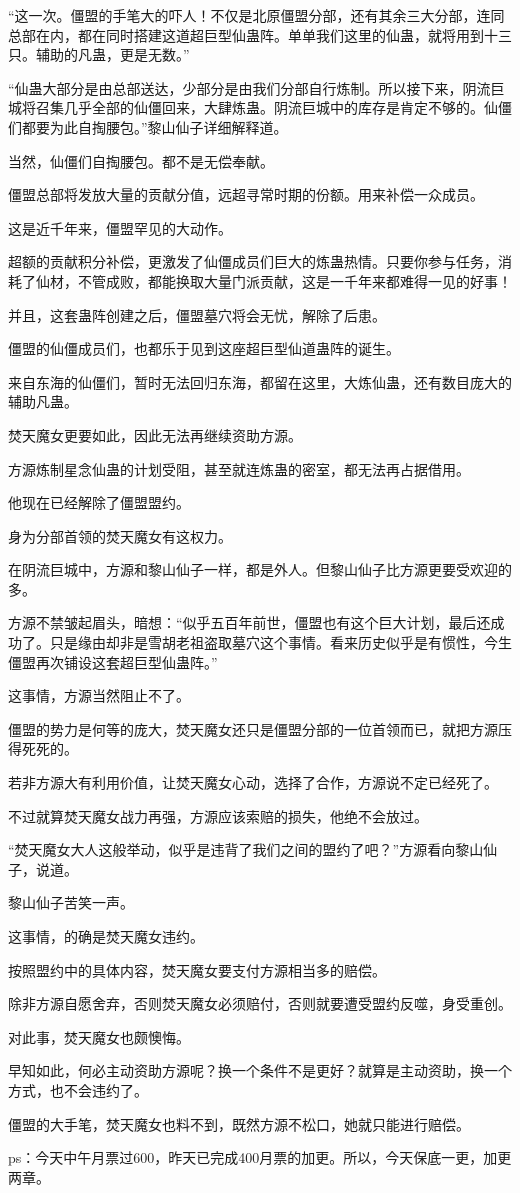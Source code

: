 \begin{this_body}
“这一次。僵盟的手笔大的吓人！不仅是北原僵盟分部，还有其余三大分部，连同总部在内，都在同时搭建这道超巨型仙蛊阵。单单我们这里的仙蛊，就将用到十三只。辅助的凡蛊，更是无数。”

“仙蛊大部分是由总部送达，少部分是由我们分部自行炼制。所以接下来，阴流巨城将召集几乎全部的仙僵回来，大肆炼蛊。阴流巨城中的库存是肯定不够的。仙僵们都要为此自掏腰包。”黎山仙子详细解释道。

当然，仙僵们自掏腰包。都不是无偿奉献。

僵盟总部将发放大量的贡献分值，远超寻常时期的份额。用来补偿一众成员。

这是近千年来，僵盟罕见的大动作。

超额的贡献积分补偿，更激发了仙僵成员们巨大的炼蛊热情。只要你参与任务，消耗了仙材，不管成败，都能换取大量门派贡献，这是一千年来都难得一见的好事！

并且，这套蛊阵创建之后，僵盟墓穴将会无忧，解除了后患。

僵盟的仙僵成员们，也都乐于见到这座超巨型仙道蛊阵的诞生。

来自东海的仙僵们，暂时无法回归东海，都留在这里，大炼仙蛊，还有数目庞大的辅助凡蛊。

焚天魔女更要如此，因此无法再继续资助方源。

方源炼制星念仙蛊的计划受阻，甚至就连炼蛊的密室，都无法再占据借用。

他现在已经解除了僵盟盟约。

身为分部首领的焚天魔女有这权力。

在阴流巨城中，方源和黎山仙子一样，都是外人。但黎山仙子比方源更要受欢迎的多。

方源不禁皱起眉头，暗想：“似乎五百年前世，僵盟也有这个巨大计划，最后还成功了。只是缘由却非是雪胡老祖盗取墓穴这个事情。看来历史似乎是有惯性，今生僵盟再次铺设这套超巨型仙蛊阵。”

这事情，方源当然阻止不了。

僵盟的势力是何等的庞大，焚天魔女还只是僵盟分部的一位首领而已，就把方源压得死死的。

若非方源大有利用价值，让焚天魔女心动，选择了合作，方源说不定已经死了。

不过就算焚天魔女战力再强，方源应该索赔的损失，他绝不会放过。

“焚天魔女大人这般举动，似乎是违背了我们之间的盟约了吧？”方源看向黎山仙子，说道。

黎山仙子苦笑一声。

这事情，的确是焚天魔女违约。

按照盟约中的具体内容，焚天魔女要支付方源相当多的赔偿。

除非方源自愿舍弃，否则焚天魔女必须赔付，否则就要遭受盟约反噬，身受重创。

对此事，焚天魔女也颇懊悔。

早知如此，何必主动资助方源呢？换一个条件不是更好？就算是主动资助，换一个方式，也不会违约了。

僵盟的大手笔，焚天魔女也料不到，既然方源不松口，她就只能进行赔偿。

ps：今天中午月票过600，昨天已完成400月票的加更。所以，今天保底一更，加更两章。

\end{this_body}


